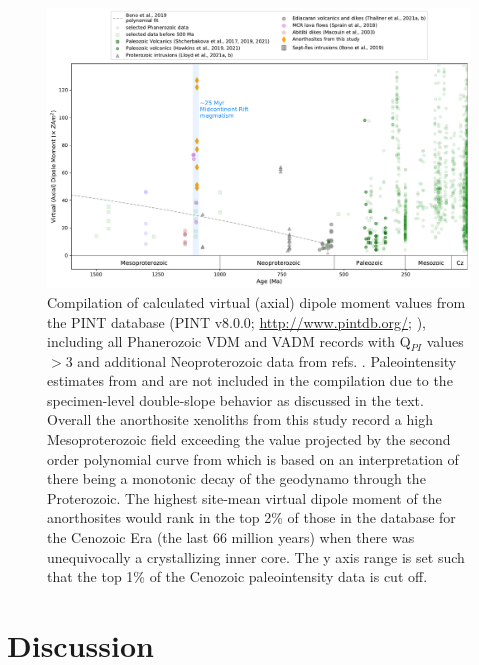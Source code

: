 \documentclass[9pt,twocolumn,twoside,lineno]{pnas-new}
\begin{document}
\begin{figure}[h!]
\noindent\includegraphics[width=17.8 cm]{PINT_compilation.pdf}
\centering
\caption{\footnotesize{Compilation of calculated virtual (axial) dipole moment values from the PINT database (PINT v8.0.0; \url{http://www.pintdb.org/};  \citealp{Bono2021a}), including all Phanerozoic VDM and VADM records with Q$_{PI}$ values $>$3 and additional Neoproterozoic data from refs. \citealp{Lloyd2021a, Lloyd2021b, Thallner2021a, Thallner2021b}. Paleointensity estimates from \cite{Pesonen1983a} and \cite{Kulakov2013a} are not included in the compilation due to the specimen-level double-slope behavior as discussed in the text. Overall the anorthosite xenoliths from this study record a high Mesoproterozoic field exceeding the value projected by the second order polynomial curve from \cite{Bono2019a} which is based on an interpretation of there being a monotonic decay of the geodynamo through the Proterozoic. The highest site-mean virtual dipole moment of the anorthosites would rank in the top 2$\%$ of those in the database for the Cenozoic Era (the last 66 million years) when there was unequivocally a crystallizing inner core. The y axis range is set such that the top 1\% of the Cenozoic paleointensity data is cut off.}}
\label{fig:PINT_compilation}
\end{figure}

\section*{Discussion}
\end{document}
